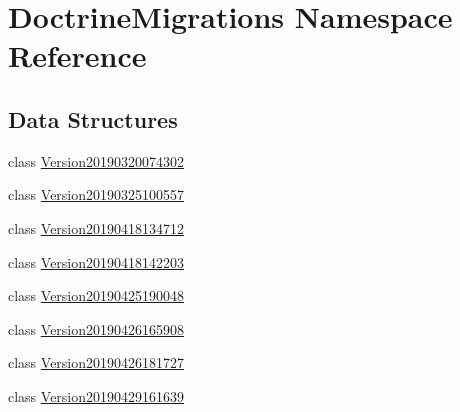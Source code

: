 \hypertarget{namespace_doctrine_migrations}{}\section{Doctrine\+Migrations Namespace Reference}
\label{namespace_doctrine_migrations}
\subsection*{Data Structures}
\begin{DoxyCompactItemize}
\item 
class \mbox{\hyperlink{class_doctrine_migrations_1_1_version20190320074302}{Version20190320074302}}
\item 
class \mbox{\hyperlink{class_doctrine_migrations_1_1_version20190325100557}{Version20190325100557}}
\item 
class \mbox{\hyperlink{class_doctrine_migrations_1_1_version20190418134712}{Version20190418134712}}
\item 
class \mbox{\hyperlink{class_doctrine_migrations_1_1_version20190418142203}{Version20190418142203}}
\item 
class \mbox{\hyperlink{class_doctrine_migrations_1_1_version20190425190048}{Version20190425190048}}
\item 
class \mbox{\hyperlink{class_doctrine_migrations_1_1_version20190426165908}{Version20190426165908}}
\item 
class \mbox{\hyperlink{class_doctrine_migrations_1_1_version20190426181727}{Version20190426181727}}
\item 
class \mbox{\hyperlink{class_doctrine_migrations_1_1_version20190429161639}{Version20190429161639}}
\end{DoxyCompactItemize}

